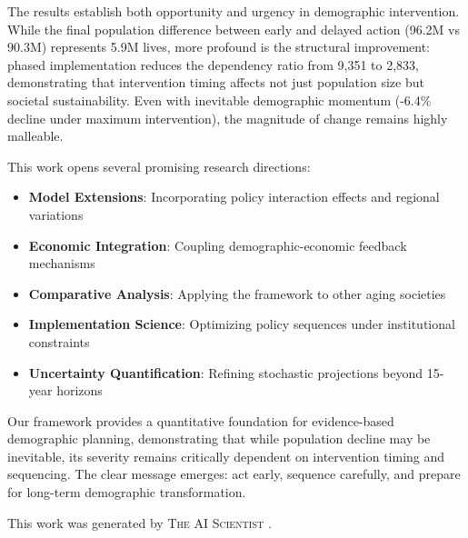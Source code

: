\documentclass{article} %
\begin{document}
The results establish both opportunity and urgency in demographic intervention. While the final population difference between early and delayed action (96.2M vs 90.3M) represents 5.9M lives, more profound is the structural improvement: phased implementation reduces the dependency ratio from 9,351 to 2,833, demonstrating that intervention timing affects not just population size but societal sustainability. Even with inevitable demographic momentum (-6.4\% decline under maximum intervention), the magnitude of change remains highly malleable.

This work opens several promising research directions:
\begin{itemize}
    \item \textbf{Model Extensions}: Incorporating policy interaction effects and regional variations
    \item \textbf{Economic Integration}: Coupling demographic-economic feedback mechanisms
    \item \textbf{Comparative Analysis}: Applying the framework to other aging societies
    \item \textbf{Implementation Science}: Optimizing policy sequences under institutional constraints
    \item \textbf{Uncertainty Quantification}: Refining stochastic projections beyond 15-year horizons
\end{itemize}

Our framework provides a quantitative foundation for evidence-based demographic planning, demonstrating that while population decline may be inevitable, its severity remains critically dependent on intervention timing and sequencing. The clear message emerges: act early, sequence carefully, and prepare for long-term demographic transformation.

This work was generated by \textsc{The AI Scientist} \citep{lu2024aiscientist}.



\end{document}

